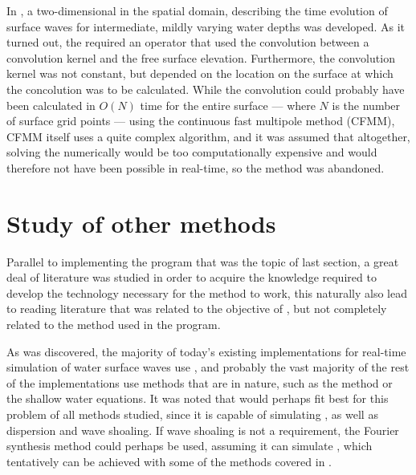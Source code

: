In , a two-dimensional \PDE in the spatial domain, describing the time evolution of surface waves for intermediate, mildly varying water depths was developed. As it turned out, the \PDE required an operator that used the convolution between a convolution kernel and the free surface elevation. Furthermore, the convolution kernel was not constant, but depended on the location on the surface at which the concolution was to be calculated. While the convolution could probably have been calculated in $O(N)$ time for the entire surface --- where $N$ is the number of surface grid points --- using the continuous fast multipole method (CFMM), CFMM itself uses a quite complex algorithm, and it was assumed that altogether, solving the \PDE numerically would be too computationally expensive and would therefore not have been possible in real-time, so the method was abandoned.

\section{Study of other methods}

Parallel to implementing the program that was the topic of last section, a great deal of literature was studied in order to acquire the knowledge required to develop the technology necessary for the method to work, this naturally also lead to reading literature that was related to the objective of \thismasterthesiswork, but not completely related to the method used in the program.

As was discovered, the majority of today's existing implementations for real-time simulation of water surface waves use , and probably the vast majority of the rest of the implementations use methods that are  in nature, such as the \LPD method or the shallow water equations. It was noted that \LPD would perhaps fit best for this problem of all methods studied, since it is capable of simulating \FSI, as well as dispersion and wave shoaling. If wave shoaling is not a requirement, the Fourier synthesis method could perhaps be used, assuming it can simulate \FSI, which tentatively can be achieved with some of the methods covered in .
